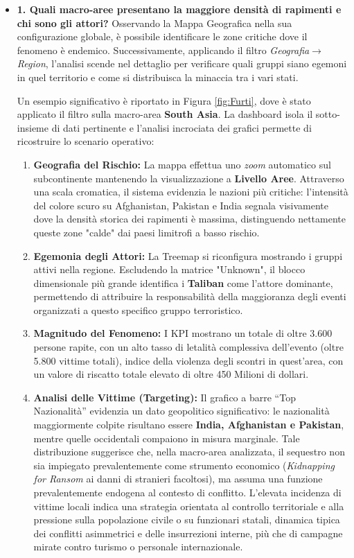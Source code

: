 \begin{itemize}
    \item \textbf{1. Quali macro-aree presentano la maggiore densità di rapimenti e chi sono gli attori?}
    Osservando la Mappa Geografica nella sua configurazione globale, è possibile identificare le zone critiche dove il fenomeno è endemico. Successivamente, applicando il filtro \textit{Geografia$\rightarrow$Region}, l'analisi scende nel dettaglio per verificare quali gruppi siano egemoni in quel territorio e come si distribuisca la minaccia tra i vari stati.

    Un esempio significativo è riportato in Figura \ref{fig:Furti}, dove è stato applicato il filtro sulla macro-area \textbf{South Asia}. La dashboard isola il sotto-insieme di dati pertinente e l'analisi incrociata dei grafici permette di ricostruire lo scenario operativo:
    \begin{enumerate}
        \item \textbf{Geografia del Rischio:} La mappa effettua uno \textit{zoom} automatico sul subcontinente mantenendo la visualizzazione a \textbf{Livello Aree}. Attraverso una scala cromatica, il sistema evidenzia le nazioni più critiche: l'intensità del colore scuro su Afghanistan, Pakistan e India segnala visivamente dove la densità storica dei rapimenti è massima, distinguendo nettamente queste zone "calde" dai paesi limitrofi a basso rischio.
        \item \textbf{Egemonia degli Attori:} La Treemap si riconfigura mostrando i gruppi attivi nella regione. Escludendo la matrice "Unknown", il blocco dimensionale più grande identifica i \textbf{Taliban} come l'attore dominante, permettendo di attribuire la responsabilità della maggioranza degli eventi organizzati a questo specifico gruppo terroristico.
        \item \textbf{Magnitudo del Fenomeno:} I KPI mostrano un totale di oltre 3.600 persone rapite,  con un alto tasso di letalità complessiva dell'evento (oltre 5.800 vittime totali), indice della violenza degli scontri in quest'area, con un valore di riscatto totale elevato di oltre 450 Milioni di dollari.
        \item \textbf{Analisi delle Vittime (Targeting):} Il grafico a barre ``Top Nazionalità'' evidenzia un dato geopolitico significativo: le nazionalità maggiormente colpite risultano essere \textbf{India, Afghanistan e Pakistan}, mentre quelle occidentali compaiono in misura marginale. Tale distribuzione suggerisce che, nella macro-area analizzata, il sequestro non sia impiegato prevalentemente come strumento economico (\textit{Kidnapping for Ransom} ai danni di stranieri facoltosi), ma assuma una funzione prevalentemente endogena al contesto di conflitto. L’elevata incidenza di vittime locali indica una strategia orientata al controllo territoriale e alla pressione sulla popolazione civile o su funzionari statali, dinamica tipica dei conflitti asimmetrici e delle insurrezioni interne, più che di campagne mirate contro turismo o personale internazionale.

\end{enumerate}
\end{itemize}
